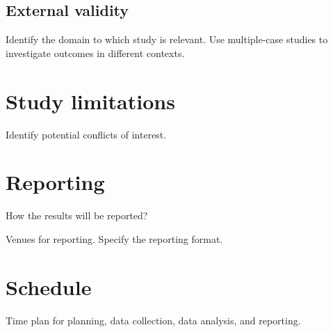 \subsection{External validity}
\label{subsec:external}
Identify the domain to which study is relevant. Use multiple-case studies to investigate outcomes in different contexts. 

\section{Study limitations}
\label{sec:limitations}
Identify potential conflicts of interest. 

\section{Reporting}
\label{sec:reporting}
How the results will be reported? 

Venues for reporting. Specify the reporting format.

\section{Schedule}
\label{sec:schedule}
Time plan for planning, data collection, data analysis, and reporting.


